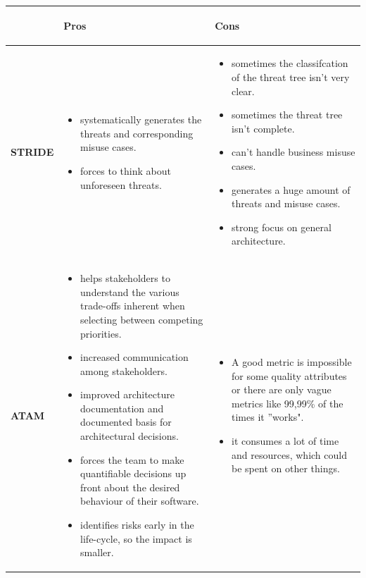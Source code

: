 \documentclass[a4paper,11pt]{report}
\begin{document}
\begin{tabular}{| p{1.5cm} | p{6cm} | p{6cm} | }
\hline
 & \color{green}\begin{center}\textbf{Pros}\end{center} & \color{red}\begin{center}\textbf{Cons}\end{center} \\\hline
\begin{center}\textbf{STRIDE}\end{center} & 
\begin{itemize}
\item systematically generates the threats and corresponding misuse cases.
\item forces to think about unforeseen threats.
\end{itemize} &
\begin{itemize}
\item sometimes the classifcation of the threat tree isn't very clear.
\item sometimes the threat tree isn't complete.
\item can't handle business misuse cases.
\item generates a huge amount of threats and misuse cases.
\item strong focus on general architecture. 
\end{itemize} \\\hline
\begin{center}\textbf{ATAM}\end{center} & 
\begin{itemize}
\item helps stakeholders to understand the various trade-offs inherent when selecting between competing priorities.
\item increased communication among stakeholders.
\item improved architecture documentation and documented basis for architectural decisions.
\item forces the team to make quantifiable decisions up front about the desired behaviour of their software.
\item identifies risks early in the life-cycle, so the impact is smaller.
\end{itemize} &
\begin{itemize}
\item A good metric is impossible for some quality attributes or there are only vague metrics like 99,99\% of the times it ''works".
\item it consumes a lot of time and resources, which could be spent on other things.
\end{itemize} \\\hline
\end{tabular}
\end{document}
